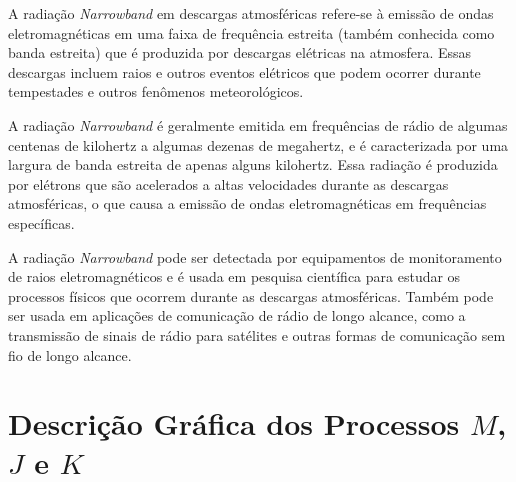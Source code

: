 \documentclass[a4paper, 12pt, onecolumn,singlespacing]{article}
\begin{document}
	A radiação \textit{Narrowband} em descargas atmosféricas refere-se à emissão de ondas eletromagnéticas em uma faixa de frequência estreita (também conhecida como banda estreita) que é produzida por descargas elétricas na atmosfera. Essas descargas incluem raios e outros eventos elétricos que podem ocorrer durante tempestades e outros fenômenos meteorológicos.
	
	A radiação \textit{Narrowband} é geralmente emitida em frequências de rádio de algumas centenas de kilohertz a algumas dezenas de megahertz, e é caracterizada por uma largura de banda estreita de apenas alguns kilohertz. Essa radiação é produzida por elétrons que são acelerados a altas velocidades durante as descargas atmosféricas, o que causa a emissão de ondas eletromagnéticas em frequências específicas.
	
	A radiação \textit{Narrowband} pode ser detectada por equipamentos de monitoramento de raios eletromagnéticos e é usada em pesquisa científica para estudar os processos físicos que ocorrem durante as descargas atmosféricas. Também pode ser usada em aplicações de comunicação de rádio de longo alcance, como a transmissão de sinais de rádio para satélites e outras formas de comunicação sem fio de longo alcance.
	
	\section{Descrição Gráfica dos Processos $M$, $J$ e $K$}
	
\end{document}
